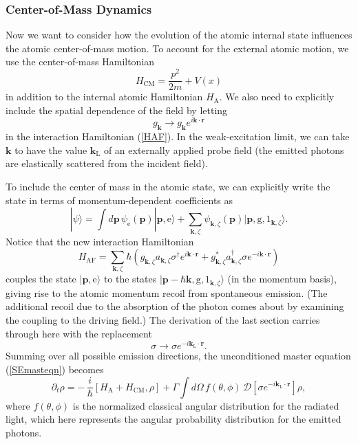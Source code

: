 \documentclass[aps,twocolumn,superscriptaddress,footinbib,floatfix,showpacs]{revtex4}
\def\ket#1{|{#1}\rangle}
\def\HAF{H_\mathrm{\scriptscriptstyle AF}}
\def\HA{H_\mathrm{\scriptscriptstyle A}}
\def\HCM{H_\mathrm{\scriptscriptstyle CM}}
\def\kLbf{\mathbf{k}_\mathrm{\scriptscriptstyle L}}
\begin{document}
\subsubsection{Center-of-Mass Dynamics}
Now we want to consider how the evolution of the atomic internal state
influences the atomic center-of-mass motion.
To account for the external atomic motion, we use the center-of-mass
Hamiltonian
\begin{equation}
  \HCM = \frac{p^2}{2m} + V(x)
\end{equation}
in addition to the internal atomic Hamiltonian $\HA$.
We also need to explicitly include the spatial dependence of the field
by letting
\begin{equation}
  g_\mathbf{k}\longrightarrow g_\mathbf{k} e^{i\mathbf{k}\cdot\mathbf{r}}
\end{equation}
in the interaction Hamiltonian (\ref{HAF}).
In the weak-excitation limit, we can take $\mathbf{k}$ to
have the value $\kLbf$ of an externally applied probe field 
(the emitted photons are elastically scattered from the incident field).


To include the center of mass in the atomic state, we can explicitly write the
state in terms of 
momentum-dependent coefficients as
\begin{equation}
  \ket\psi = \int d\mathbf{p}\,\psi_\mathrm{e}(\mathbf{p})\ket{\mathbf{p},\mathrm{e}}
   + \sum_{\mathbf{k},\zeta} \psi_{\mathbf{k},\zeta}(\mathbf{p})\ket{\mathbf{p},\mathrm{g},1_{\mathbf{k},\zeta}}.
\end{equation}
Notice that the new interaction Hamiltonian
\begin{equation}
  \HAF =\sum_{\mathbf{k},\zeta}
      \hbar\left(g_{\mathbf{k},\zeta}a_{\mathbf{k},\zeta}\sigma^\dagger e^{i\mathbf{k}\cdot\mathbf{r}}
          +g^*_{\mathbf{k},\zeta}a^\dagger_{\mathbf{k},\zeta}\sigma e^{-i\mathbf{k}\cdot\mathbf{r}}\right)
  \label{HAFp}
\end{equation}
couples the state $\ket{\mathbf{p},\mathrm{e}}$ 
to the states $\ket{\mathbf{p}-\hbar\mathbf{k},\mathrm{g},1_{\mathbf{k},\zeta}}$
(in the momentum basis),
giving rise to the atomic momentum recoil from spontaneous emission.
(The additional recoil due to the absorption of the photon comes about
by examining the coupling to the driving field.)
The derivation of the last section carries through here with the
replacement 
\begin{equation}
  \sigma\longrightarrow\sigma e^{-i\kLbf\cdot\mathbf{r}}.
\end{equation}
Summing over all possible emission directions, the
unconditioned master equation (\ref{SEmasteqn}) becomes
\begin{equation}
  \partial_t\rho = -\,\frac{i}{\hbar}[\HA+\HCM,\rho] 
  +\Gamma\int d\Omega\, f(\theta,\phi)\, \mathcal{D}\!\left[\sigma e^{-i\kLbf\cdot\mathbf{r}}\right]\rho,
  \label{SEmasteqnwithp}
\end{equation}
where $f(\theta,\phi)$ is the normalized classical angular distribution
for the radiated light, which here represents the angular probability
distribution for the emitted photons.
\end{document}
